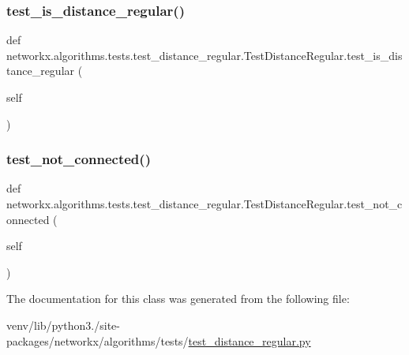 \subsubsection{\texorpdfstring{test\+\_\+is\+\_\+distance\+\_\+regular()}{test\_is\_distance\_regular()}}
{\footnotesize\ttfamily def networkx.\+algorithms.\+tests.\+test\+\_\+distance\+\_\+regular.\+Test\+Distance\+Regular.\+test\+\_\+is\+\_\+distance\+\_\+regular (\begin{DoxyParamCaption}\item[{}]{self }\end{DoxyParamCaption})}

\mbox{\label{classnetworkx_1_1algorithms_1_1tests_1_1test__distance__regular_1_1TestDistanceRegular_a8fa1fe8ef729537e3376c771006b0d0d}} 
\subsubsection{\texorpdfstring{test\+\_\+not\+\_\+connected()}{test\_not\_connected()}}
{\footnotesize\ttfamily def networkx.\+algorithms.\+tests.\+test\+\_\+distance\+\_\+regular.\+Test\+Distance\+Regular.\+test\+\_\+not\+\_\+connected (\begin{DoxyParamCaption}\item[{}]{self }\end{DoxyParamCaption})}



The documentation for this class was generated from the following file\+:\begin{DoxyCompactItemize}
\item 
venv/lib/python3./site-\/packages/networkx/algorithms/tests/\hyperlink{test__distance__regular_8py}{test\+\_\+distance\+\_\+regular.\+py}\end{DoxyCompactItemize}
